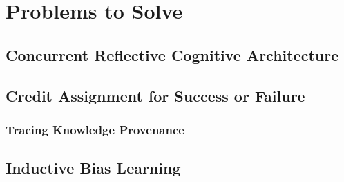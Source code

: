 \chapter{Problems to Solve}\label{ch:problems_to_solve}

\section{Concurrent Reflective Cognitive Architecture}



\section{Credit Assignment for Success or Failure}

\subsection{Tracing Knowledge Provenance}

\section{Inductive Bias Learning}

